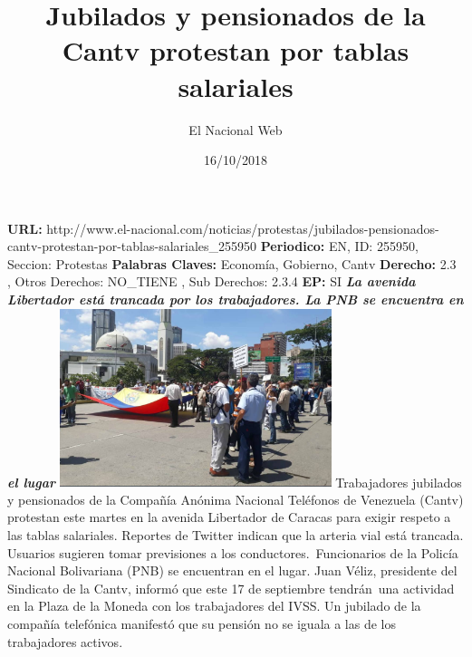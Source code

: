 \documentclass{article}%
\title{\textbf{Jubilados y pensionados de la Cantv protestan por tablas salariales}}%
\author{El Nacional Web}%
\date{16/10/2018}%
\begin{document}
%
\normalsize%
\maketitle%
\textbf{URL: }%
http://www.el{-}nacional.com/noticias/protestas/jubilados{-}pensionados{-}cantv{-}protestan{-}por{-}tablas{-}salariales\_255950\newline%
%
\textbf{Periodico: }%
EN, %
ID: %
255950, %
Seccion: %
Protestas\newline%
%
\textbf{Palabras Claves: }%
Economía, Gobierno, Cantv\newline%
%
\textbf{Derecho: }%
2.3%
, Otros Derechos: %
NO\_TIENE%
, Sub Derechos: %
2.3.4%
\newline%
%
\textbf{EP: }%
SI\newline%
\newline%
%
\textbf{\textit{La avenida Libertador está trancada por los trabajadores. La PNB se encuentra en el lugar}}%
\newline%
\newline%
%
\includegraphics[width=300px]{178.jpg}%
\newline%
%
Trabajadores jubilados y pensionados de la Compañía Anónima Nacional Teléfonos de Venezuela (Cantv) protestan este martes en la avenida Libertador de Caracas para exigir respeto a las tablas salariales.%
\newline%
%
Reportes de Twitter indican que la arteria vial está trancada. Usuarios sugieren tomar previsiones a los conductores.~Funcionarios de la Policía Nacional Bolivariana (PNB) se encuentran en el lugar.%
\newline%
%
Juan Véliz, presidente del Sindicato de la Cantv, informó que este 17 de septiembre tendrán~una actividad en la Plaza de la Moneda con los trabajadores del IVSS.%
\newline%
%
Un jubilado de la compañía telefónica manifestó que su pensión no se iguala a las de los trabajadores activos.%
\newline%
%
\end{document}
